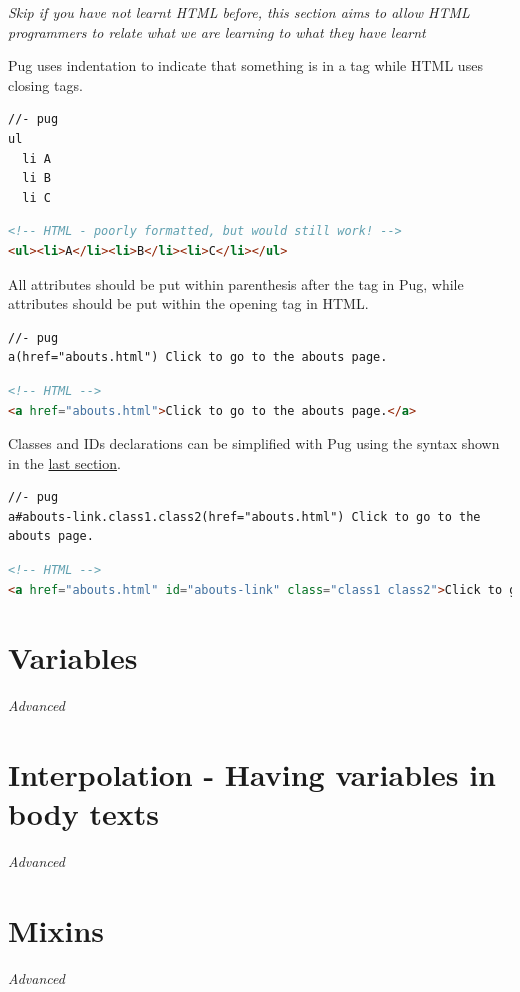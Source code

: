 \textit{Skip if you have not learnt HTML before, this section aims to allow HTML programmers to relate what we are learning to what they have learnt}
\vspace{6mm}

Pug uses indentation to indicate that something is in a tag while HTML uses closing tags.
\vspace{6mm}

\begin{lstlisting}[language=pug]
//- pug
ul
  li A
  li B
  li C
\end{lstlisting}

\begin{lstlisting}[language=html]
<!-- HTML - poorly formatted, but would still work! -->
<ul><li>A</li><li>B</li><li>C</li></ul>
\end{lstlisting}

All attributes should be put within parenthesis after the tag in Pug, while attributes should be put within the opening tag in HTML.
\vspace{6mm}

\begin{lstlisting}[language=pug]
//- pug
a(href="abouts.html") Click to go to the abouts page.
\end{lstlisting}

\begin{lstlisting}[language=html]
<!-- HTML -->
<a href="abouts.html">Click to go to the abouts page.</a>
\end{lstlisting}

Classes and IDs declarations can be simplified with Pug using the syntax shown in the \hyperref[sec:classesids]{last section}.
\vspace{6mm}

\begin{lstlisting}[language=pug]
//- pug
a#abouts-link.class1.class2(href="abouts.html") Click to go to the abouts page.
\end{lstlisting}

\begin{lstlisting}[language=html]
<!-- HTML -->
<a href="abouts.html" id="abouts-link" class="class1 class2">Click to go to the abouts page.</a>
\end{lstlisting}

\section{Variables}

\textit{Advanced}
\vspace{6mm}


\section{Interpolation - Having variables in body texts}

\textit{Advanced}
\vspace{6mm}

\section{Mixins}

\textit{Advanced}
\vspace{6mm}

